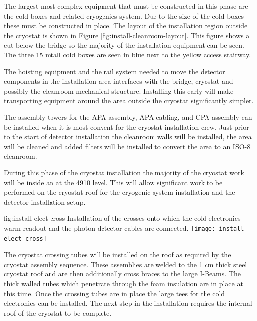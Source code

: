 The largest most complex equipment that must be constructed in this phase are the cold boxes and related cryogenics system. 
Due to the size of the cold boxes these must be constructed in place. 
The layout of the installation region outside the cryostat is shown in Figure \ref{fig:install-cleanroom-layout}. 
This figure shows a cut below the bridge so the majority of the installation equipment can be seen. 
The three 15 \si{m}tall cold boxes are seen in blue next to the yellow access stairway. 

The hoisting equipment and the rail system needed to move the detector components in the installation area interfaces with the bridge, cryostat and possibly the cleanroom mechanical structure. 
Installing this early will make transporting equipment around the area outside the cryostat significantly simpler. 
 
The assembly towers for the APA assembly, APA cabling, and CPA assembly can be installed when it is most convent for the cryostat installation crew. 
Just prior to the start of detector installation the cleanroom walls will be installed, the area will be cleaned and added filters will be installed to convert the area to an ISO-8 cleanroom.

During this phase of the cryostat installation the majority of the cryostat work will be inside an at the 4910 level. 
This will allow significant work to be performed on the cryostat roof for the cryogenic system installation and the detector installation setup. 

\begin{dunefigure}{fig:install-elect-cross}
  {Installation of the crosses onto which the cold electronics warm readout and the photon detector cables are connected.}
 \texttt{[image: install-elect-cross]}
\end{dunefigure}

The cryostat crossing tubes will be installed on the roof as required by the cryostat assembly sequence. 
These assemblies are welded to the 1 \si{cm} thick steel cryostat roof and are then additionally cross braces to the large I-Beams. 
The thick walled tubes which penetrate through the foam insulation are in place at this time. 
Once the crossing tubes are in place the large tees for the cold electronics can be installed. 
The next step in the installation requires the internal roof of the cryostat to be complete. 



